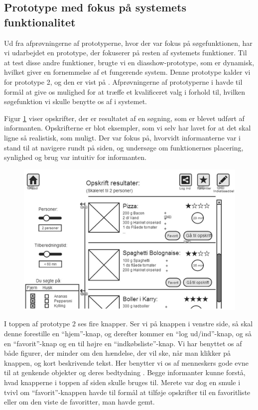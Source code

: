 \subsection{Prototype med fokus på systemets funktionalitet}
\label{subsec:prototype2}

Ud fra afprøvningerne af prototyperne, hvor der var fokus på søgefunktionen, har vi udarbejdet en prototype, der fokuserer på resten af systemets funktioner. Til at test disse andre funktioner, brugte vi en diasshow-prototype, som er dynamisk, hvilket giver en fornemmelse af et fungerende system. Denne prototype kalder vi for prototype 2, og den er vist på . Afprøvningerne af prototyperne i  havde til formål at give os mulighed for at træffe et kvalificeret valg i forhold til, hvilken søgefunktion vi skulle benytte os af i systemet. 

Figur \ref{fig:prototype2design} viser opskrifter, der er resultatet af en søgning, som er blevet udført af informanten. Opskrifterne er blot eksempler, som vi selv har lavet for at det skal ligne så realistisk, som muligt. Der var fokus på, hvorvidt informanterne var i stand til at navigere rundt på siden, og undersøge om funktionernes placering, synlighed og brug var intuitiv for informanten.

\begin{figure}[H]
	\centering
	\includegraphics[scale=0.7]{billeder/prototyper/prototype2.png}
	\label{fig:prototype2design}
\end{figure}

I toppen af prototype 2 ses fire knapper. Ser vi på knappen i venstre side, så skal denne forestille en ``hjem''-knap, og derefter kommer en ``log ud/ind''-knap, og så en ``favorit''-knap og en til højre en ``indkøbsliste''-knap. Vi har benyttet os af både figurer, der minder om den hændelse, der vil ske, når man klikker på knappen, og kort beskrivende tekst. Her benytter vi os af menneskers gode evne til at genkende objekter og deres bedtydning \cite[s. ~340]{deb}. Begge informanter kunne forstå, hvad knapperne i toppen af siden skulle bruges til. Merete var dog en smule i tvivl om ``favorit''-knappen havde til formål at tilføje opskrifter til en favoritliste eller om den viste de favoritter, man havde gemt.

